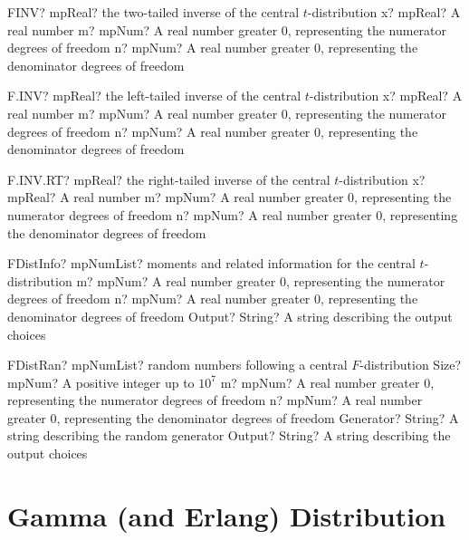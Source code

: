 \documentclass[12pt,a4paper,openany]{book}
\begin{document}
\begin{mpFunctionsExtract}
\mpWorksheetFunctionThreeNotImplemented
{FINV? mpReal? the two-tailed inverse of the central $t$-distribution}
{x? mpReal? A real number}
{m? mpNum? A real number greater 0, representing the numerator  degrees of freedom}
{n? mpNum? A real number greater 0, representing the denominator degrees of freedom}
\end{mpFunctionsExtract}

\begin{mpFunctionsExtract}
\mpWorksheetFunctionThreeNotImplemented
{F.INV? mpReal? the left-tailed inverse of the central $t$-distribution}
{x? mpReal? A real number}
{m? mpNum? A real number greater 0, representing the numerator  degrees of freedom}
{n? mpNum? A real number greater 0, representing the denominator degrees of freedom}
\end{mpFunctionsExtract}

\begin{mpFunctionsExtract}
\mpWorksheetFunctionThreeNotImplemented
{F.INV.RT? mpReal? the right-tailed inverse of the central $t$-distribution}
{x? mpReal? A real number}
{m? mpNum? A real number greater 0, representing the numerator  degrees of freedom}
{n? mpNum? A real number greater 0, representing the denominator degrees of freedom}
\end{mpFunctionsExtract}

\begin{mpFunctionsExtract}
\mpFunctionThreeNotImplemented
{FDistInfo? mpNumList? moments and related information for the central $t$-distribution}
{m? mpNum? A real number greater 0, representing the numerator  degrees of freedom}
{n? mpNum? A real number greater 0, representing the denominator degrees of freedom}
{Output? String? A string describing the output choices}
\end{mpFunctionsExtract}

\begin{mpFunctionsExtract}
\mpFunctionFiveNotImplemented
{FDistRan? mpNumList? random numbers following a central $F$-distribution}
{Size? mpNum? A positive integer up to $10^7$}
{m? mpNum? A real number greater 0, representing the numerator  degrees of freedom}
{n? mpNum? A real number greater 0, representing the denominator degrees of freedom}
{Generator? String? A string describing the random generator}
{Output? String? A string describing the output choices}
\end{mpFunctionsExtract}

\section{Gamma (and Erlang) Distribution}
\end{document}
